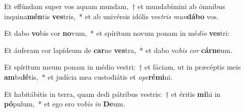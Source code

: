 \item Et effúndam super vos aquam mundam,~† et mundabímini ab ómnibus inquina\textbf{mén}tis \textbf{ves}tris,~* et ab univérsis idólis ves\textit{tris} \textit{mun}\textbf{dá}\textbf{bo} vos.
\item Et dabo \textbf{vo}bis cor \textbf{no}vum,~* et spíritum novum ponam in mé\textit{di}\textit{o} \textbf{ves}tri:
\item Et áuferam cor lapídeum de \textbf{car}ne \textbf{ves}tra,~* et dabo vo\textit{bis} \textit{cor} \textbf{cár}\textbf{ne}um.
\item Et spíritum meum ponam in médio vestri:~† et fáciam, ut in præcéptis meis \textbf{am}bu\textbf{lé}tis,~* et judícia mea custodiátis et \textit{o}\textit{pe}\textbf{ré}\textbf{mi}ni.
\item Et habitábitis in terra, quam dedi pátribus vestris:~† et éritis \textbf{mi}hi in \textbf{pó}pulum,~* et ego ero vo\textit{bis} \textit{in} \textbf{De}um.
